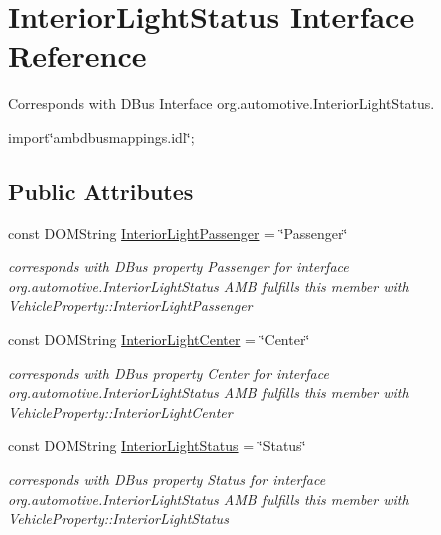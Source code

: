 \hypertarget{interfaceInteriorLightStatus}{\section{Interior\+Light\+Status Interface Reference}
\label{interfaceInteriorLightStatus}
}


Corresponds with D\+Bus Interface org.\+automotive.\+Interior\+Light\+Status.  




{\ttfamily import\char`\"{}ambdbusmappings.\+idl\char`\"{};}

\subsection*{Public Attributes}
\begin{DoxyCompactItemize}
\item 
const D\+O\+M\+String \hyperlink{interfaceInteriorLightStatus_abf8320eb6b0e7c6b60bbc90d91760832}{Interior\+Light\+Passenger} = \char`\"{}Passenger\char`\"{}
\begin{DoxyCompactList}\small\item\em corresponds with D\+Bus property Passenger for interface org.\+automotive.\+Interior\+Light\+Status A\+M\+B fulfills this member with Vehicle\+Property\+::\+Interior\+Light\+Passenger \end{DoxyCompactList}\item 
\hypertarget{interfaceInteriorLightStatus_a65f623a6bfcf7dd09b8634ea2bd28238}{const D\+O\+M\+String \hyperlink{interfaceInteriorLightStatus_a65f623a6bfcf7dd09b8634ea2bd28238}{Interior\+Light\+Center} = \char`\"{}Center\char`\"{}}\label{interfaceInteriorLightStatus_a65f623a6bfcf7dd09b8634ea2bd28238}

\begin{DoxyCompactList}\small\item\em corresponds with D\+Bus property Center for interface org.\+automotive.\+Interior\+Light\+Status A\+M\+B fulfills this member with Vehicle\+Property\+::\+Interior\+Light\+Center \end{DoxyCompactList}\item 
\hypertarget{interfaceInteriorLightStatus_a93968b6203be5a851eece2ba7d94efb3}{const D\+O\+M\+String \hyperlink{interfaceInteriorLightStatus_a93968b6203be5a851eece2ba7d94efb3}{Interior\+Light\+Status} = \char`\"{}Status\char`\"{}}\label{interfaceInteriorLightStatus_a93968b6203be5a851eece2ba7d94efb3}

\begin{DoxyCompactList}\small\item\em corresponds with D\+Bus property Status for interface org.\+automotive.\+Interior\+Light\+Status A\+M\+B fulfills this member with Vehicle\+Property\+::\+Interior\+Light\+Status \end{DoxyCompactList}\end{DoxyCompactItemize}


